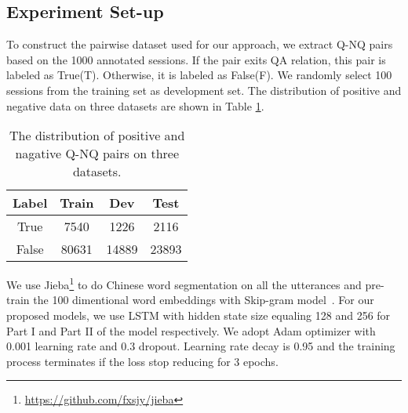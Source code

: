 



\subsection{Experiment Set-up}
 
 To construct the pairwise dataset used for our approach, we extract Q-NQ pairs based on the 1000 annotated sessions. If the pair exits QA relation, this pair is labeled as True(T). Otherwise, it is labeled as False(F). We randomly select 100 sessions from the training set as development set. The distribution of positive and negative data on three datasets are shown in Table \ref{tab:pairdata}.
 
 \begin{table}[h]
 	\small
    \centering
    \begin{tabular}{cccc}
        \toprule[1.1pt]
        Label &Train& Dev& Test\\
        \midrule[0.8pt]
        True &7540 & 1226  & 2116\\
        \hline
        False & 80631 & 14889 & 23893  \\
        \bottomrule[1.1pt]
    \end{tabular}
    \caption{The distribution of positive and nagative Q-NQ pairs on three datasets.}
    \label{tab:pairdata}
\end{table}


We use Jieba\footnote{\url{https://github.com/fxsjy/jieba}} to do Chinese word segmentation on all the utterances and pre-train the 100 dimentional word embeddings with Skip-gram model~\cite{mikolov2013efficient}. For our proposed models, we use LSTM with hidden state size equaling 128 and 256 for Part I and Part II of the model respectively. We adopt Adam optimizer with 0.001 learning rate and 0.3 dropout. Learning rate decay is 0.95 and the training process terminates if the loss stop reducing for 3 epochs.
